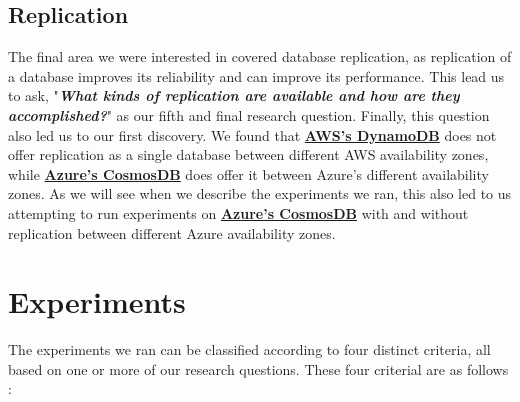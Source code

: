 
\subsection{Replication}

The final area we were interested in covered database replication, as replication of a database improves its reliability and can improve its performance.  This lead us to ask, "\emph{\textbf{What kinds of replication are available and how are they accomplished?}}" as our fifth and final research question.  Finally, this question also led us to our first discovery.  We found that \textbf{\underline{AWS's DynamoDB}} does not offer replication as a single database between different AWS availability zones, while \textbf{\underline{Azure's CosmosDB}} does offer it between Azure's different availability zones.  As we will see when we describe the experiments we ran, this also led to us attempting to run experiments on \textbf{\underline{Azure's CosmosDB}} with and without replication between different Azure availability zones.






\section{Experiments}

The experiments we ran can be classified according to four distinct criteria, all based on one or more of our research questions.  These four criterial are as follows :

